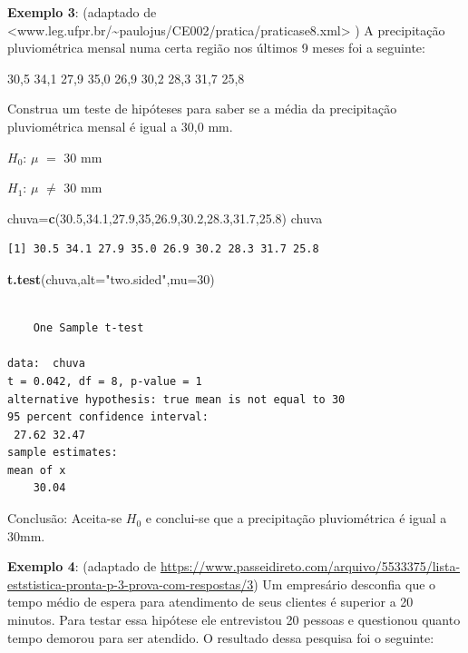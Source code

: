 \documentclass[12pt,brazil,oneside]{book}
\newenvironment{Shaded}{\begin{snugshade}}{\end{snugshade}}
\newcommand{\DataTypeTok}[1]{\textcolor[rgb]{0.13,0.29,0.53}{#1}}
\newcommand{\DecValTok}[1]{\textcolor[rgb]{0.00,0.00,0.81}{#1}}
\newcommand{\FloatTok}[1]{\textcolor[rgb]{0.00,0.00,0.81}{#1}}
\newcommand{\KeywordTok}[1]{\textcolor[rgb]{0.13,0.29,0.53}{\textbf{#1}}}
\newcommand{\NormalTok}[1]{#1}
\newcommand{\StringTok}[1]{\textcolor[rgb]{0.31,0.60,0.02}{#1}}
\begin{document}
\textbf{Exemplo 3}: (adaptado de \textless{}www.leg.ufpr.br/\textasciitilde{}paulojus/CE002/pratica/praticase8.xml\textgreater{} ) A precipitação pluviométrica mensal numa certa região nos últimos 9 meses foi a seguinte:

30,5 34,1 27,9 35,0 26,9 30,2 28,3 31,7 25,8

Construa um teste de hipóteses para saber se a média da precipitação pluviométrica mensal é igual a 30,0 mm.

\textbf{\(H_0\)}: \(\mu\) \(=\) 30 mm

\textbf{\(H_1\)}: \(\mu\) \(\neq\) 30 mm

\begin{Shaded}
\begin{Highlighting}[]
\NormalTok{chuva=}\KeywordTok{c}\NormalTok{(}\FloatTok{30.5}\NormalTok{,}\FloatTok{34.1}\NormalTok{,}\FloatTok{27.9}\NormalTok{,}\DecValTok{35}\NormalTok{,}\FloatTok{26.9}\NormalTok{,}\FloatTok{30.2}\NormalTok{,}\FloatTok{28.3}\NormalTok{,}\FloatTok{31.7}\NormalTok{,}\FloatTok{25.8}\NormalTok{)}
\NormalTok{chuva}
\end{Highlighting}
\end{Shaded}

\begin{verbatim}
[1] 30.5 34.1 27.9 35.0 26.9 30.2 28.3 31.7 25.8
\end{verbatim}

\begin{Shaded}
\begin{Highlighting}[]
\KeywordTok{t.test}\NormalTok{(chuva,}\DataTypeTok{alt=}\StringTok{"two.sided"}\NormalTok{,}\DataTypeTok{mu=}\DecValTok{30}\NormalTok{)}
\end{Highlighting}
\end{Shaded}

\begin{verbatim}

    One Sample t-test

data:  chuva
t = 0.042, df = 8, p-value = 1
alternative hypothesis: true mean is not equal to 30
95 percent confidence interval:
 27.62 32.47
sample estimates:
mean of x 
    30.04 
\end{verbatim}

Conclusão: Aceita-se \(H_0\) e conclui-se que a precipitação pluviométrica é igual a 30mm.

\textbf{Exemplo 4}: (adaptado de \url{https://www.passeidireto.com/arquivo/5533375/lista-eststistica-pronta-p-3-prova-com-respostas/3}) Um empresário desconfia que o tempo médio de espera para atendimento de seus clientes é superior a 20 minutos. Para testar essa hipótese ele entrevistou 20 pessoas e questionou quanto tempo demorou para ser atendido. O resultado dessa pesquisa foi o seguinte:
\end{document}
